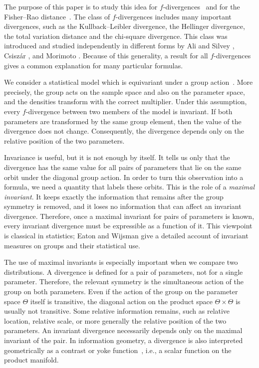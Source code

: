 \documentclass[a4paper, reqno, 11pt]{article}
\theoremstyle{definition}
\begin{document}
The purpose of this paper is to study this idea for $f$-divergences~\cite{Csiszar-1963} and for the Fisher--Rao distance~\cite{Rao-1945}. 
The class of $f$-divergences includes many important divergences, such as the Kullback--Leibler divergence, the Hellinger divergence, the total variation distance and the chi-square divergence. 
This class was introduced and studied independently in different forms by Ali and Silvey \cite{AliSilvey-1966}, Csisz\'{a}r \cite{Csiszar-1963}, and Morimoto \cite{Morimoto-1963}. 
Because of this generality, a result for all $f$-divergences gives a common explanation for many particular formulas.

We consider a statistical model which is equivariant under a group action~\cite{keener2010theoretical}. 
More precisely, the group acts on the sample space and also on the parameter space, and the densities transform with the correct multiplier. 
Under this assumption, every $f$-divergence between two members of the model is invariant. 
If both parameters are transformed by the same group element, then the value of the divergence does not change. 
Consequently, the divergence depends only on the relative position of the two parameters. 


Invariance is useful, but it is not enough by itself. 
It tells us only that the divergence has the same value for all pairs of parameters that lie on the same orbit under the diagonal group action. 
In order to turn this observation into a formula, we need a quantity that labels these orbits. 
This is the role of a {\it maximal invariant}. 
It keeps exactly the information that remains after the group symmetry is removed, and it loses no information that can affect an invariant divergence. 
Therefore, once a maximal invariant for pairs of parameters is known, every invariant divergence must be expressible as a function of it. 
This viewpoint is classical in statistics; Eaton \cite{Eaton1989}  and Wijsman \cite{Wijsman1990} give a detailed account of invariant measures on groups and their statistical use.


The use of maximal invariants is especially important when we compare two distributions. 
A divergence is defined for a pair of parameters, not for a single parameter. 
Therefore, the relevant symmetry is the simultaneous action of the group on both parameters. 
Even if the action of the group on the parameter space $\Theta$ itself is transitive, the diagonal action on the product space $\Theta \times \Theta$ is usually not transitive. 
Some relative information remains, such as relative location, relative scale, or more generally the relative position of the two parameters. 
An invariant divergence necessarily depends only on the maximal invariant of the pair. In information geometry, a divergence is also interpreted geometrically as a contrast or yoke function~\cite{eguchi1992geometry}, i.e., a scalar function on the product manifold.
\end{document}
